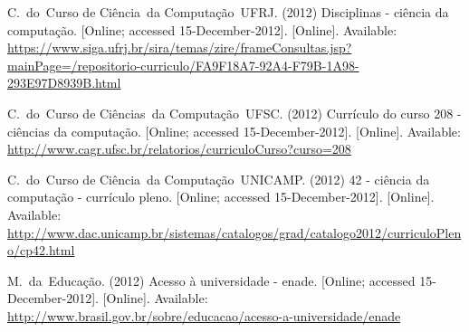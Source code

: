 \documentclass[conference]{IEEEtran}
\begin{document}
\begin{thebibliography}{10}
\BIBentryALTinterwordspacing
C.~do~Curso de Ci\^encia~da Computa{\c c}{\~a}o~UFRJ. (2012) Disciplinas -
  ci\^encia da computa{\c c}{\~a}o. [Online; accessed 15-December-2012].
  [Online]. Available:
  \url{https://www.siga.ufrj.br/sira/temas/zire/frameConsultas.jsp?mainPage=/repositorio-curriculo/FA9F18A7-92A4-F79B-1A98-293E97D8939B.html}
\BIBentrySTDinterwordspacing

\BIBentryALTinterwordspacing
C.~do~Curso de Ci\^encias~da Computa{\c c}{\~a}o~UFSC. (2012) Curr\'iculo do
  curso 208 - ci\^encias da computa{\c c}{\~a}o. [Online; accessed
  15-December-2012]. [Online]. Available:
  \url{http://www.cagr.ufsc.br/relatorios/curriculoCurso?curso=208}
\BIBentrySTDinterwordspacing

\BIBentryALTinterwordspacing
C.~do~Curso de Ci\^encia~da Computa{\c c}{\~a}o~UNICAMP. (2012) 42 - ci\^encia
  da computa{\c c}{\~a}o - curr\'iculo pleno. [Online; accessed
  15-December-2012]. [Online]. Available:
  \url{http://www.dac.unicamp.br/sistemas/catalogos/grad/catalogo2012/curriculoPleno/cp42.html}
\BIBentrySTDinterwordspacing

\BIBentryALTinterwordspacing
M.~da~Educa{\c c}{\~a}o. (2012) Acesso \`a universidade - enade. [Online;
  accessed 15-December-2012]. [Online]. Available:
  \url{http://www.brasil.gov.br/sobre/educacao/acesso-a-universidade/enade}
\BIBentrySTDinterwordspacing

\end{thebibliography}
\end{document}
